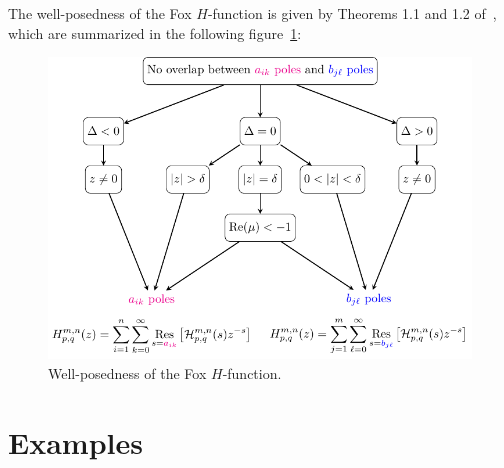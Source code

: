 \documentclass[11pt]{article}
\begin{document}
The well-posedness of the Fox $H$-function is given by Theorems 1.1 and 1.2
of~\cite{kilbas.saigo:04:h-transforms}, which are summarized in the following
figure~\ref{F:Wellposedness}:

\begin{figure}[htp]
  \centering
  \includegraphics[width=1.0\textwidth]{./Well-posedness.pdf}
  \caption{Well-posedness of the Fox $H$-function.}
  \label{F:Wellposedness}
\end{figure}

\section{Examples}








 
\end{document}
